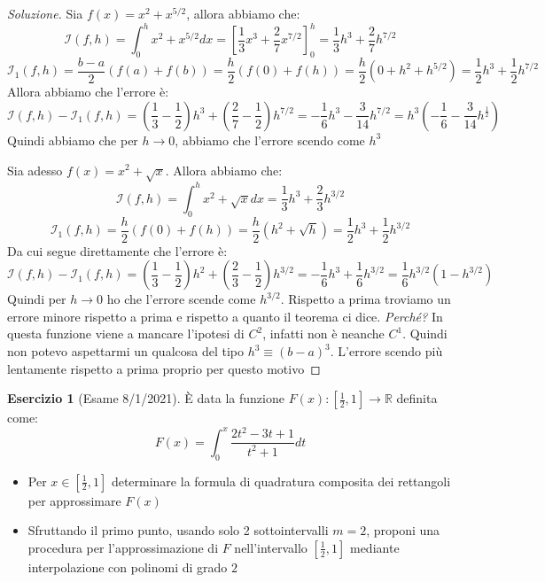 \documentclass[11pt,a4paper,twoside]{article}
\theoremstyle{definition}
\newtheorem*{ese}{Esercizio}
\newenvironment{sol}
	{\renewcommand\qedsymbol{$\blacksquare$}\begin{proof}[Soluzione]}
	{\end{proof}}
\begin{document}
\begin{sol}
	 Sia $f(x) = x^2 + x^{5/2}$, allora abbiamo che:
	\[ \mathcal I(f,h) = \int_0^h x^2 + x^{5/2}dx = \left[ \frac 13 x^3 + \frac 27 x^{7/2} \right]_0^h = \frac 13 h^3 + \frac 27 h^{7/2} \]
	\[ \mathcal I_1(f,h) = \frac{b-a}2 (f(a) + f(b)) = \frac h2(f(0) + f(h)) = \frac h2 (0+h^2 + h^{5/2}) = \frac 12 h^3 + \frac 12 h^{7/2} \]
	Allora abbiamo che l'errore è:
	\[ \mathcal I(f,h) - \mathcal I_1(f,h) = \left( \frac 13 - \frac 12 \right)h^3 + \left( \frac 27 - \frac 12 \right) h^{7/2} = -\frac 16 h^3 - \frac{3}{14}h^{7/2} = h^3\left(-\frac 16 - \frac 3{14} h^{\frac 12} \right) \]
	Quindi abbiamo che per $h\to 0$, abbiamo che l'errore scendo come $h^3$

	 Sia adesso $f(x) = x^2 + \sqrt x$. Allora abbiamo che:
	\[ \mathcal I(f,h) = \int_0^h x^2 + \sqrt x dx = \frac 13 h^3 + \frac 23 h^{3/2} \]
	\[ \mathcal I_1(f,h) = \frac h2(f(0) + f(h)) = \frac h2(h^2 + \sqrt h) = \frac 12 h^3 + \frac 12 h^{3/2} \]
	Da cui segue direttamente che l'errore è:
	\[ \mathcal I(f,h) - \mathcal I_1(f,h) = \left( \frac 13 - \frac 12 \right)h^2 + \left(\frac 23 - \frac 12\right)h^{3/2} = -\frac 16 h^3 + \frac 16 h^{3/2} = \frac 16 h^{3/2}(1-h^{3/2}) \]
	Quindi per $h \to 0$ ho che l'errore scende come $h^{3/2}$. Rispetto a prima troviamo un errore minore rispetto a prima e rispetto a quanto il teorema ci dice. \textit{Perché?} In questa funzione viene a mancare l'ipotesi di $C^2$, infatti non è neanche $C^1$. Quindi non potevo aspettarmi un qualcosa del tipo $h^3 \equiv (b-a)^3$. L'errore scendo più lentamente rispetto a prima proprio per questo motivo
\end{sol}

\begin{ese}[Esame 8/1/2021]
	È data la funzione $F(x):[\frac 12,1] \to\mathbb R$ definita come:
	\[ F(x) = \int_0^x \frac{2t^2 - 3t +1}{t^2+1}dt \]
	\begin{itemize}
		\item Per $x \in [\frac 12, 1]$ determinare la formula di quadratura composita dei rettangoli per approssimare $F(x)$
		\item Sfruttando il primo punto, usando solo 2 sottointervalli $m = 2$, proponi una procedura per l'approssimazione di $F$ nell'intervallo $[\frac 12, 1]$ mediante interpolazione con polinomi di grado $2$
	\end{itemize}
\end{ese}
\end{document}
